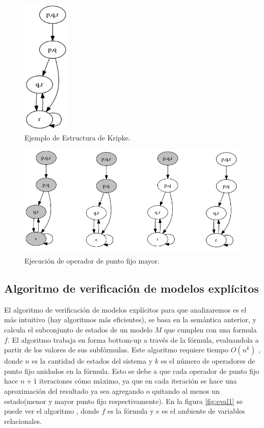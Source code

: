 \begin{figure}[h!]
  \centering
  \includegraphics[width=0.2\textwidth]{Figures/kripke3.png}
  \caption{Ejemplo de Estructura de Kripke.} 
  \label{fig:kripke3}
\end{figure}
\begin{figure}[H]
  \centering
  \includegraphics[width=1\textwidth]{Figures/kripke3-gfp1.png}
  \caption{Ejecución de operador de punto fijo mayor.} 
  \label{fig:kripke3-gfp1}
\end{figure}

\subsection{Algoritmo de verificación de modelos explícitos}

El algoritmo de verificación de modelos explícitos para {\mucalculo} que analizaremos es el más intuitivo (hay algoritmos más eficientes), se basa en la semántica anterior, y calcula el subconjunto de estados de un modelo $M$ que cumplen con una formula $f$. El algoritmo trabaja en forma bottom-up a través de la fórmula, evaluandola a partir de los valores de sus subfórmulas. Este algoritmo requiere tiempo $O(n^{k})$ \cite{Clarke:1}, donde $n$ es la cantidad de estados del sistema y $k$ es el número de operadores de punto fijo anidados en la fórmula. Esto se debe a que cada operador de punto fijo hace $n+1$ iteraciones cómo máximo, ya que en cada iteración se hace una aproximación del resultado ya sea agregando o quitando al menos un estado(menor y mayor punto fijo respectivamente). En la figura \ref{fig:eval1} se puede ver el algoritmo , donde $f$ es la fórmula y $e$ es el ambiente de variables relacionales.

